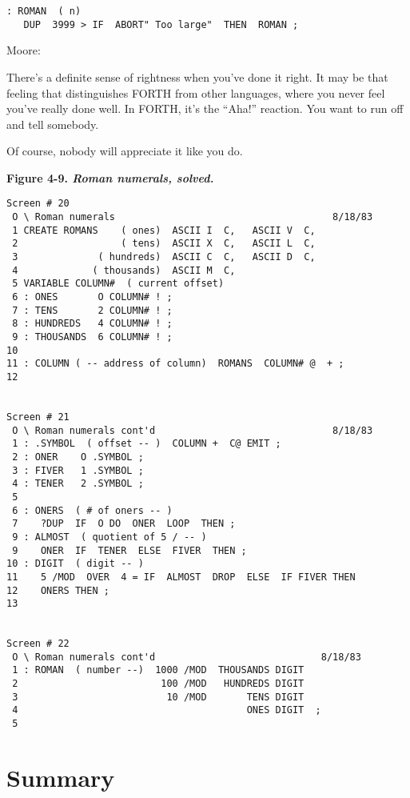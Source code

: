 \begin{verbatim}
: ROMAN  ( n)
   DUP  3999 > IF  ABORT" Too large"  THEN  ROMAN ;
\end{verbatim}

Moore:

There's a definite sense of rightness when you've done it right. It may be
that feeling that distinguishes FORTH from other languages, where you
never feel you've really done well. In FORTH, it's the ``Aha!'' reaction. You
want to run off and tell somebody.

Of course, nobody will appreciate it like you do.

\bf{Figure 4-9.} \emph{Roman numerals, solved.}

\begin{verbatim}
Screen # 20
 O \ Roman numerals                                      8/18/83
 1 CREATE ROMANS    ( ones)  ASCII I  C,   ASCII V  C,
 2                  ( tens)  ASCII X  C,   ASCII L  C,
 3              ( hundreds)  ASCII C  C,   ASCII D  C,
 4             ( thousands)  ASCII M  C,
 5 VARIABLE COLUMN#  ( current offset)
 6 : ONES       O COLUMN# ! ;
 7 : TENS       2 COLUMN# ! ;
 8 : HUNDREDS   4 COLUMN# ! ;
 9 : THOUSANDS  6 COLUMN# ! ;
10
11 : COLUMN ( -- address of column)  ROMANS  COLUMN# @  + ;
12


Screen # 21
 O \ Roman numerals cont'd                               8/18/83
 1 : .SYMBOL  ( offset -- )  COLUMN +  C@ EMIT ;
 2 : ONER    O .SYMBOL ;
 3 : FIVER   1 .SYMBOL ;
 4 : TENER   2 .SYMBOL ;
 5
 6 : ONERS  ( # of oners -- )
 7    ?DUP  IF  O DO  ONER  LOOP  THEN ;
 9 : ALMOST  ( quotient of 5 / -- )
 9    ONER  IF  TENER  ELSE  FIVER  THEN ;
10 : DIGIT  ( digit -- )
11    5 /MOD  OVER  4 = IF  ALMOST  DROP  ELSE  IF FIVER THEN
12    ONERS THEN ;
13


Screen # 22
 O \ Roman numerals cont'd                             8/18/83
 1 : ROMAN  ( number --)  1000 /MOD  THOUSANDS DIGIT
 2                         100 /MOD   HUNDREDS DIGIT
 3                          10 /MOD       TENS DIGIT
 4                                        ONES DIGIT  ;
 5
\end{verbatim}

\section{Summary}

